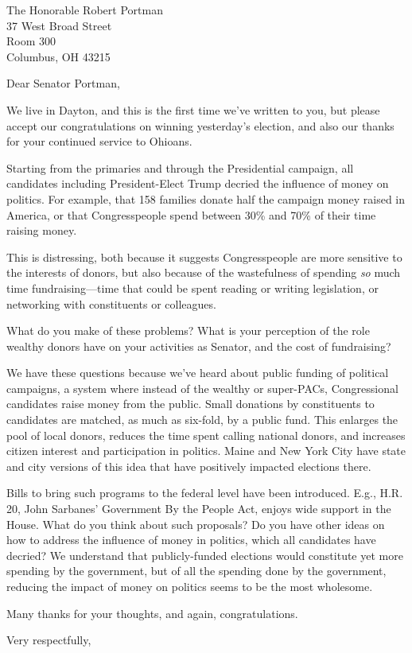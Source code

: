 \documentclass{letter}
\begin{document}
\begin{letter}{
  The Honorable Robert Portman \\
  37 West Broad Street \\
  Room 300 \\
  Columbus, OH 43215}

\opening{Dear Senator Portman,}

We live in Dayton, and this is the first time we've written to you, but please
accept our congratulations on winning yesterday's election, and also our thanks
for your continued service to Ohioans.

Starting from the primaries and through the Presidential campaign, all
candidates including President-Elect Trump decried the influence of money on
politics. For example, that 158 families donate half the campaign money raised
in America, or that Congresspeople spend between 30\% and 70\% of their time
raising money.

This is distressing, both because it suggests Congresspeople are more sensitive
to the interests of donors, but also because of the wastefulness of spending
{\em so} much time fundraising---time that could be spent reading or writing
legislation, or networking with constituents or colleagues.

What do you make of these problems? What is your perception of the role wealthy
donors have on your activities as Senator, and the cost of fundraising?

We have these questions because we've heard about public funding of political
campaigns, a system where instead of the wealthy or super-PACs, Congressional
candidates raise money from the public. Small donations by constituents to
candidates are matched, as much as six-fold, by a public fund. This enlarges the
pool of local donors, reduces the time spent calling national donors, and
increases citizen interest and participation in politics. Maine and New York
City have state and city versions of this idea that have positively impacted
elections there.

Bills to bring such programs to the federal level have been introduced. E.g.,
H.R. 20, John Sarbanes' Government By the People Act, enjoys wide support in the
House. What do you think about such proposals? Do you have other ideas on how to
address the influence of money in politics, which all candidates have decried?
We understand that publicly-funded elections would constitute yet more spending
by the government, but of all the spending done by the government, reducing the
impact of money on politics seems to be the most wholesome.

Many thanks for your thoughts, and again, congratulations.


\closing{Very respectfully,}


\end{letter}
\end{document}
